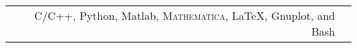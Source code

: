 \renewcommand{\arraystretch}{1.1}

	\begin{tabular}{>{}r>{}p{13cm}} 
		C/C++, Python, Matlab, \textsc{Mathematica}, \LaTeX, Gnuplot, and Bash
	\end{tabular}
